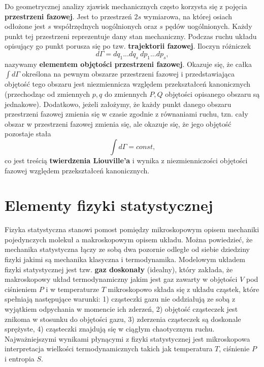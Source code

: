 \documentclass[12pt,a4paper,openright]{report} %
\begin{document}
Do geometrycznej analizy zjawisk mechanicznych często korzysta się z pojęcia \textbf{przestrzeni fazowej}. Jest to przestrzeń $2s$ wymiarowa, na której osiach odłożone jest $s$ współrzędnych uogólnionych oraz $s$ pędów uogólnionych. Każdy punkt tej przestrzeni reprezentuje dany stan mechaniczny. Podczas ruchu układu opisujący go punkt porusza się po tzw. \textbf{trajektorii fazowej}. Iloczyn różniczek
\begin{equation}
d\Gamma = dq_1 ... dq_s ~ dp_1 ... dp_s,
\end{equation} 
nazywamy \textbf{elementem objętości przestrzeni fazowej}. Okazuje się, że całka $\int d \Gamma$ określona na pewnym obszarze przestrzeni fazowej i przedstawiająca objętość tego obszaru jest niezmiennicza względem przekształceń kanonicznych (przechodząc od zmiennych $p,q$ do zmiennych $P,Q$ objętości opisanego obszaru są jednakowe). Dodatkowo, jeżeli założymy, że każdy punkt danego obszaru przestrzeni fazowej zmienia się w czasie zgodnie z równaniami ruchu, tzn. cały obszar w przestrzeni fazowej zmienia się, ale okazuje się, że jego objętość pozostaje stała
\begin{equation}
\int d \Gamma = const,
\end{equation}
co jest treścią \textbf{twierdzenia Liouville'a} i wynika z niezmienniczości objętości fazowej względem przekształceń kanonicznych.
\section{Elementy fizyki statystycznej}
Fizyka statystyczna stanowi pomost pomiędzy mikroskopowym opisem mechaniki pojedynczych molekuł a makroskopowym opisem układu. Można powiedzieć, że mechanika statystyczna łączy ze sobą dwa pozornie odległe od siebie dziedziny fizyki jakimi są mechanika klasyczna i termodynamika. Modelowym układem fizyki statystycznej jest tzw. \textbf{gaz doskonały} (idealny), który zakłada, że makroskopowy układ termodynamiczny jakim jest gaz zawarty w objętości $V$ pod ciśnieniem $P$ i w temperaturze $T$ mikroskopowo składa się z układu cząstek, które spełniają następujące warunki: 1) cząsteczki gazu nie oddziałują ze sobą z wyjątkiem odpychania w momencie ich zderzeń, 2) objętość cząsteczek jest znikoma w stosunku do objętości gazu, 3) zderzenia cząsteczek są doskonale sprężyste, 4) cząsteczki znajdują się w ciągłym chaotycznym ruchu. Najważniejszymi wynikami płynącymi z fizyki statystycznej jest mikroskopowa interpretacja wielkości termodynamicznych takich jak temperatura $T$, ciśnienie $P$ i entropia $S$.\\
\end{document}
